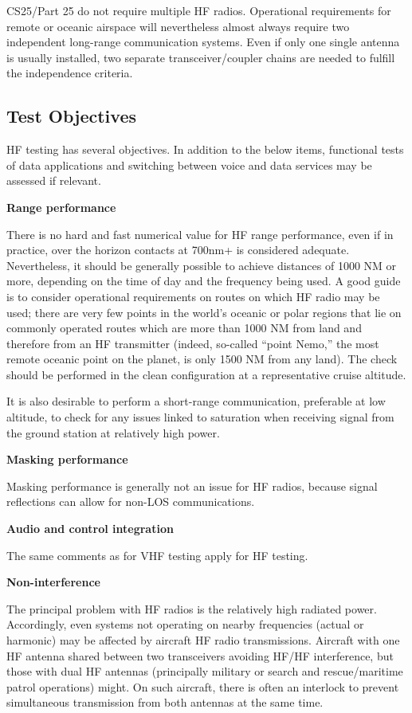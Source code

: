 \documentclass[
]{book}
\begin{document}
CS25/Part 25 do not require multiple HF radios. Operational requirements for
remote or oceanic airspace will nevertheless almost always require two
independent long-range communication systems. Even if only one single antenna
is usually installed, two separate transceiver/coupler chains are needed to
fulfill the independence criteria.

\hypertarget{test-objectives-1}{%
\subsection{Test Objectives}\label{test-objectives-1}}

HF testing has several objectives. In addition to the below items, functional
tests of data applications and switching between voice and data services may be
assessed if relevant.

\textbf{Range performance}

There is no hard and fast numerical value for HF range performance, even if in
practice, over the horizon contacts at 700nm+ is considered adequate.
Nevertheless, it should be generally possible to achieve distances of 1000 NM
or more, depending on the time of day and the frequency being used. A good
guide is to consider operational requirements on routes on which HF radio may
be used; there are very few points in the world's oceanic or polar regions that
lie on commonly operated routes which are more than 1000 NM from land and
therefore from an HF transmitter (indeed, so-called ``point Nemo,'' the most
remote oceanic point on the planet, is only 1500 NM from any land). The check
should be performed in the clean configuration at a representative cruise
altitude.

It is also desirable to perform a short-range communication, preferable at low
altitude, to check for any issues linked to saturation when receiving signal
from the ground station at relatively high power.

\textbf{Masking performance}

Masking performance is generally not an issue for HF radios, because signal
reflections can allow for non-LOS communications.

\textbf{Audio and control integration}

The same comments as for VHF testing apply for HF testing.

\textbf{Non-interference}

The principal problem with HF radios is the relatively high radiated power.
Accordingly, even systems not operating on nearby frequencies (actual or
harmonic) may be affected by aircraft HF radio transmissions. Aircraft with one
HF antenna shared between two transceivers avoiding HF/HF interference, but
those with dual HF antennas (principally military or search and rescue/maritime
patrol operations) might. On such aircraft, there is often an interlock to
prevent simultaneous transmission from both antennas at the same time.
\end{document}
